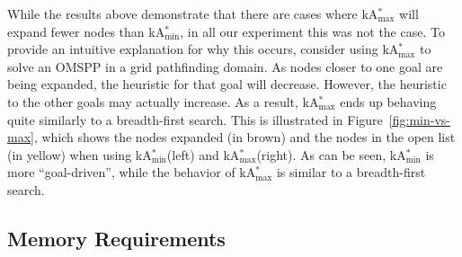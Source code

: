 \documentclass[smallextended]{svjour3}       %
\newcommand{\omspp}{\ac{OMSPP}\xspace}
\newcommand{\kastarvar}[1]{\textup{kA}$^*_{#1}$\xspace}
\newcommand{\kastarmin}{\kastarvar{\min}}
\newcommand{\kastarmax}{\kastarvar{\max}}
\begin{document}
While the results above demonstrate that there are cases where \kastarmax will expand fewer nodes than \kastarmin, in all our experiment this was not the case. 
To provide an intuitive explanation for why this occurs, consider using \kastarmax to solve an \omspp in a grid pathfinding domain. As nodes closer to one goal are being expanded, the heuristic for that goal will decrease. However, the heuristic to the other goals may actually increase. As a result, \kastarmax ends up behaving quite similarly to a breadth-first search. This is illustrated in Figure~\ref{fig:min-vs-max}, which shows the nodes expanded (in brown) and the nodes in the open list (in yellow) when using \kastarmin (left) and \kastarmax (right). As can be seen, \kastarmin is more ``goal-driven'', while the behavior of \kastarmax is similar to a breadth-first search.  


\subsection{Memory Requirements}
\end{document}
